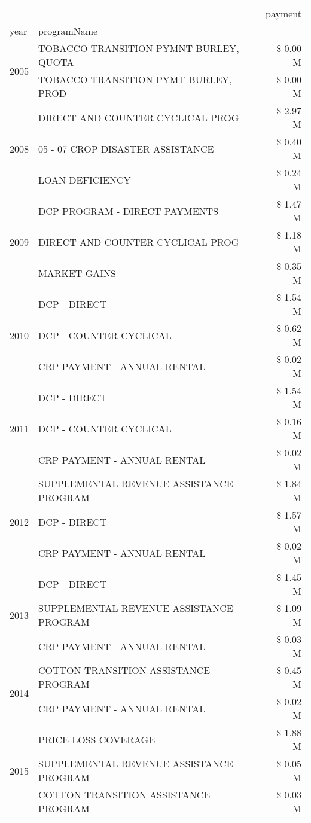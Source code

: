 \begin{tabular}{llr}
\toprule
 &  & payment \\
year & programName &  \\
\midrule
\multirow[t]{2}{*}{2005} & TOBACCO TRANSITION PYMNT-BURLEY, QUOTA & \$ 0.00 M \\
 & TOBACCO TRANSITION PYMT-BURLEY, PROD & \$ 0.00 M \\
\cline{1-3}
\multirow[t]{3}{*}{2008} & DIRECT AND COUNTER CYCLICAL PROG & \$ 2.97 M \\
 & 05 - 07 CROP DISASTER ASSISTANCE & \$ 0.40 M \\
 & LOAN DEFICIENCY & \$ 0.24 M \\
\cline{1-3}
\multirow[t]{3}{*}{2009} & DCP PROGRAM - DIRECT PAYMENTS & \$ 1.47 M \\
 & DIRECT AND COUNTER CYCLICAL PROG & \$ 1.18 M \\
 & MARKET GAINS & \$ 0.35 M \\
\cline{1-3}
\multirow[t]{3}{*}{2010} & DCP - DIRECT & \$ 1.54 M \\
 & DCP - COUNTER CYCLICAL & \$ 0.62 M \\
 & CRP PAYMENT - ANNUAL RENTAL & \$ 0.02 M \\
\cline{1-3}
\multirow[t]{3}{*}{2011} & DCP - DIRECT & \$ 1.54 M \\
 & DCP - COUNTER CYCLICAL & \$ 0.16 M \\
 & CRP PAYMENT - ANNUAL RENTAL & \$ 0.02 M \\
\cline{1-3}
\multirow[t]{3}{*}{2012} & SUPPLEMENTAL REVENUE ASSISTANCE PROGRAM & \$ 1.84 M \\
 & DCP - DIRECT & \$ 1.57 M \\
 & CRP PAYMENT - ANNUAL RENTAL & \$ 0.02 M \\
\cline{1-3}
\multirow[t]{3}{*}{2013} & DCP - DIRECT & \$ 1.45 M \\
 & SUPPLEMENTAL REVENUE ASSISTANCE PROGRAM & \$ 1.09 M \\
 & CRP PAYMENT - ANNUAL RENTAL & \$ 0.03 M \\
\cline{1-3}
\multirow[t]{2}{*}{2014} & COTTON TRANSITION ASSISTANCE PROGRAM & \$ 0.45 M \\
 & CRP PAYMENT - ANNUAL RENTAL & \$ 0.02 M \\
\cline{1-3}
\multirow[t]{3}{*}{2015} & PRICE LOSS COVERAGE & \$ 1.88 M \\
 & SUPPLEMENTAL REVENUE ASSISTANCE PROGRAM & \$ 0.05 M \\
 & COTTON TRANSITION ASSISTANCE PROGRAM & \$ 0.03 M \\

\end{tabular}
